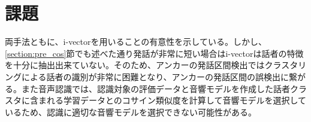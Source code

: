 \section{課題}
両手法ともに、i-vectorを用いることの有意性を示している。しかし、\ref{section:pre_cos}節でも述べた通り発話が非常に短い場合はi-vectorは話者の特徴を十分に抽出出来ていない。そのため、アンカーの発話区間検出ではクラスタリングによる話者の識別が非常に困難となり、アンカーの発話区間の誤検出に繋がる。また音声認識では、認識対象の評価データと音響モデルを作成した話者クラスタに含まれる学習データとのコサイン類似度を計算して音響モデルを選択しているため、認識に適切な音響モデルを選択できない可能性がある。

